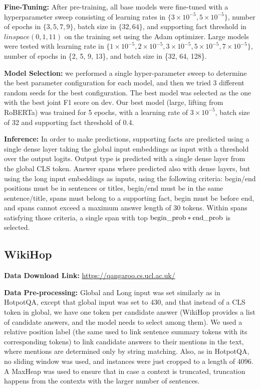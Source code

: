 \documentclass[11pt,a4paper]{article}
\begin{document}
{\bf Fine-Tuning:} After pre-training, all base models were fine-tuned with a hyperparameter sweep consisting of learning rates in $\{3\times10^{-5}, 5\times10^{-5}\}$, number of epochs in $\{3, 5, 7, 9\}$, batch size in $\{32, 64\}$, and supporting fact threshold in $\mathit{linspace}(0, 1, 11)$ on the training set using the Adam optimizer. Large models were tested with learning rate in $\{1\times10^{-5}, 2\times10^{-5}, 3\times10^{-5}, 5\times10^{-5}, 7\times10^{-5}\}$, number of epochs in \{2, 5, 9, 13\}, and batch size in \{32, 64, 128\}. 

{\bf Model Selection:} we performed a single hyper-parameter sweep to determine the best parameter configuration for each model, and then we tried 3 different random seeds for the best configuration. The best model was selected as the one with the best joint F1 score on dev. Our best model (large, lifting from RoBERTa) was trained for 5 epochs, with a learning rate of $3\times10^{-5}$, batch size of 32 and supporting fact threshold of 0.4.

{\bf Inference:} In order to make predictions, supporting facts are predicted using a single dense layer taking the global input embeddings as input with a threshold over the output logits. Output type is predicted with a single dense layer from the global CLS token. Answer spans where predicted also with dense layers, but using the long input embeddings as inputs, using the following criteria: begin/end positions must be in sentences or titles, begin/end must be in the same sentence/title, spans must belong to a supporting fact, begin must be before end, and spans cannot exceed a maximum answer length of 30 tokens. Within spans satisfying those criteria, a single span with top ${\rm begin\_prob} * {\rm end\_prob}$ is selected.


\subsection*{WikiHop}

{\bf Data Download Link:} \url{https://qangaroo.cs.ucl.ac.uk/}

{\bf Data Pre-processing:} Global and Long input was set similarly as in HotpotQA, except that global input was set to 430, and that instead of a CLS token in global, we have one token per candidate answer (WikiHop provides a list of candidate answers, and the model needs to select among them). We used a relative position label (the same used to link sentence summary tokens with its corresponding tokens) to link candidate answers to their mentions in the text, where mentions are determined only by string matching. Also, as in HotpotQA, no sliding window was used, and instances were just cropped to a length of 4096. A MaxHeap was used to ensure that in case a context is truncated, truncation happens from the contexts with the larger number of sentences. 
\end{document}
